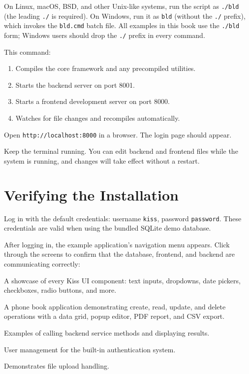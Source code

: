 \begin{warnbox}
On Linux, macOS, BSD, and other Unix-like systems, run the script as \texttt{./bld} (the leading \texttt{./} is required).  On Windows, run it as \texttt{bld} (without the \texttt{./} prefix), which invokes the \texttt{bld.cmd} batch file.  All examples in this book use the \texttt{./bld} form; Windows users should drop the \texttt{./} prefix in every command.
\end{warnbox}

\noindent
This command:
\begin{enumerate}
  \item Compiles the core framework and any precompiled utilities.
  \item Starts the backend server on port 8001.
  \item Starts a frontend development server on port 8000.
  \item Watches for file changes and recompiles automatically.
\end{enumerate}

\noindent
Open \texttt{http://localhost:8000} in a browser.  The login page should appear.

\begin{tipbox}
Keep the terminal running.  You can edit backend and frontend files while the system is running, and changes will take effect without a restart.
\end{tipbox}

\section{Verifying the Installation}
\label{sec:setup-verify}

Log in with the default credentials: username \texttt{kiss}, password \texttt{password}.  These credentials are valid when using the bundled SQLite demo database.

After logging in, the example application's navigation menu appears.  Click through the screens to confirm that the database, frontend, and backend are communicating correctly:

\begin{description}[style=nextline]
  \item[Controls] A showcase of every Kiss UI component: text inputs, dropdowns, date pickers, checkboxes, radio buttons, and more.
  \item[CRUD] A phone book application demonstrating create, read, update, and delete operations with a data grid, popup editor, PDF report, and CSV export.
  \item[REST Services] Examples of calling backend service methods and displaying results.
  \item[Users] User management for the built-in authentication system.
  \item[File Upload] Demonstrates file upload handling.
\end{description}


